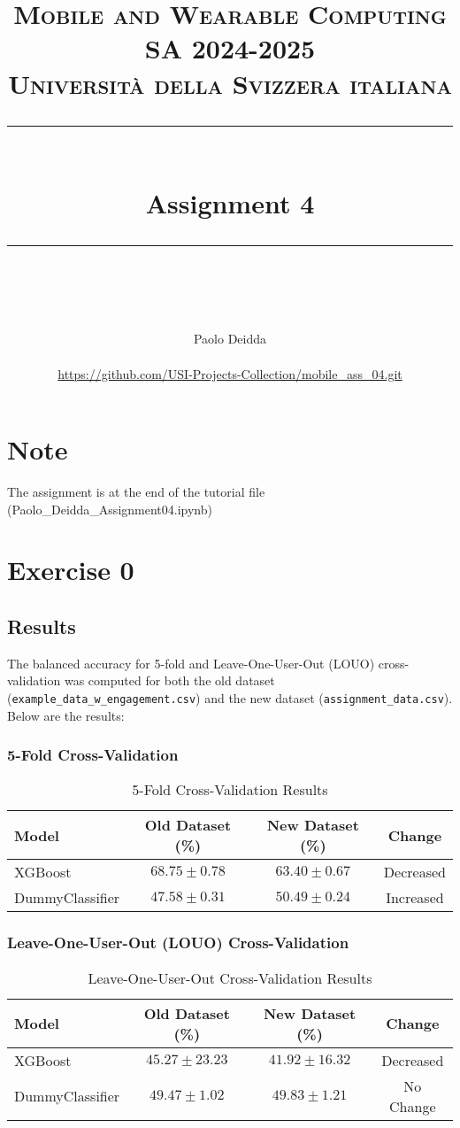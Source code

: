 \documentclass{article}
\title{
	\normalfont\normalsize
	\textsc{Mobile and Wearable Computing SA 2024-2025\\%
	Universit\`a della Svizzera italiana}\\
	\vspace{25pt}
	\rule{\linewidth}{0.5pt}\\
	\vspace{20pt}
	{\huge Assignment 4}\\
	\vspace{12pt}
	\rule{\linewidth}{1pt}\\
	\vspace{12pt}
}
\author{
  Paolo Deidda \\
  \text{paolo.deidda@usi.ch} \\ 
  \url{https://github.com/USI-Projects-Collection/mobile_ass_04.git}
}
\begin{document}
\maketitle

\vspace{2cm}

\section*{Note}
The assignment is at the end of the tutorial file (Paolo\_Deidda\_Assignment04.ipynb)

\section*{Exercise 0}

\subsection*{Results}
The balanced accuracy for 5-fold and Leave-One-User-Out (LOUO) cross-validation was computed for both the old dataset (\texttt{example\_data\_w\_engagement.csv}) and the new dataset (\texttt{assignment\_data.csv}). Below are the results:

\subsubsection*{5-Fold Cross-Validation}
\begin{table}[H]
    \centering
    \begin{tabular}{|l|c|c|c|}
        \hline
        \textbf{Model} & \textbf{Old Dataset (\%)} & \textbf{New Dataset (\%)} & \textbf{Change} \\
        \hline
        XGBoost         & $68.75 \pm 0.78$         & $63.40 \pm 0.67$          & Decreased       \\
        DummyClassifier & $47.58 \pm 0.31$         & $50.49 \pm 0.24$          & Increased       \\
        \hline
    \end{tabular}
    \caption{5-Fold Cross-Validation Results}
\end{table}

\subsubsection*{Leave-One-User-Out (LOUO) Cross-Validation}
\begin{table}[H]
    \centering
    \begin{tabular}{|l|c|c|c|}
        \hline
        \textbf{Model} & \textbf{Old Dataset (\%)} & \textbf{New Dataset (\%)} & \textbf{Change} \\
        \hline
        XGBoost         & $45.27 \pm 23.23$        & $41.92 \pm 16.32$         & Decreased       \\
        DummyClassifier & $49.47 \pm 1.02$         & $49.83 \pm 1.21$          & No Change       \\
        \hline
    \end{tabular}
    \caption{Leave-One-User-Out Cross-Validation Results}
\end{table}
\end{document}
